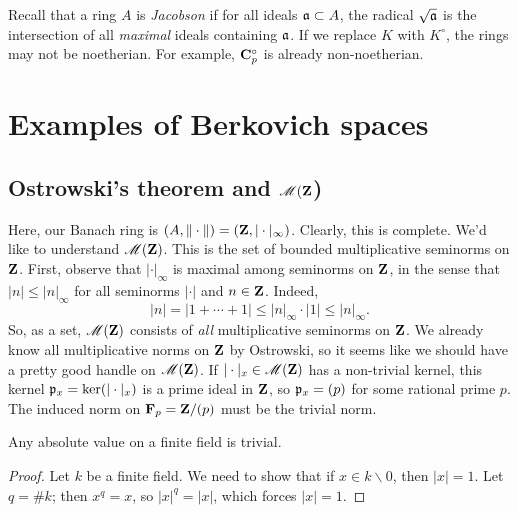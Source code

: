 Recall that a ring $A$ is \emph{Jacobson} if for all ideals $\mathfrak{a}\subset A$, the 
radical $\sqrt{\mathfrak{a}}$ is the intersection of all \emph{maximal} ideals 
containing $\mathfrak{a}$. If we replace $K$ with $K^\circ$, the rings may not be 
noetherian. For example, $\mathbf{C}_p^\circ$ is already non-noetherian. 













\section{Examples of Berkovich spaces}






\subsection{Ostrowski's theorem and \texorpdfstring{$\operatorname{\mathscr{M}}(\mathbf{Z}$)}{M(Z)}}

Here, our Banach ring is $(A,\|\cdot\|) = (\mathbf{Z},|\cdot|_\infty)$. Clearly, this 
is complete. We'd like to understand $\operatorname{\mathscr{M}}(\mathbf{Z})$. This is the set of 
bounded multiplicative seminorms on $\mathbf{Z}$. First, observe that $|\cdot|_\infty$ 
is maximal among seminorms on $\mathbf{Z}$, in the sense that 
$|n|\leqslant |n|_\infty$ for all seminorms $|\cdot|$ and $n\in \mathbf{Z}$. Indeed, 
\[
	|n| = |1+\cdots + 1| \leqslant |n|_\infty\cdot |1| \leqslant |n|_\infty .
\]
So, as a set, $\operatorname{\mathscr{M}}(\mathbf{Z})$ consists of \emph{all} multiplicative seminorms 
on $\mathbf{Z}$. We already know all multiplicative norms on $\mathbf{Z}$ by Ostrowski, 
so it seems like we should have a pretty good handle on $\operatorname{\mathscr{M}}(\mathbf{Z})$. If 
$|\cdot|_x\in \operatorname{\mathscr{M}}(\mathbf{Z})$ has a non-trivial kernel, this kernel 
$\mathfrak{p}_x=\ker(|\cdot|_x)$ is a prime ideal in $\mathbf{Z}$, so $\mathfrak{p}_x=(p)$ for some 
rational prime $p$. The induced norm on $\mathbf{F}_p = \mathbf{Z}/(p)$ must be the trivial 
norm. 

\begin{theorem}
Any absolute value on a finite field is trivial. 
\end{theorem}
\begin{proof}
Let $k$ be a finite field. We need to show that if $x\in k\smallsetminus 0$, 
then $|x|=1$. Let $q=\# k$; then $x^q=x$, so $|x|^q=|x|$, which forces 
$|x|=1$. 
\end{proof}


